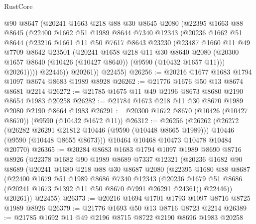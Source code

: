 \begin{lexlean}{RustCore}
\begin{coremodule}
        @90
        @8647
        (@20241
          @1663
          @218
          @88
          @30
          @8645
          @2080
          (@22395
            @1663
            @88
            @8645
            (@22400
              @1662
              @51
              @1989
              @8644
              @7340
              @12343
              (@20236
                @1662
                @51
                @8644
                (@23216
                  @1661
                  @11
                  @50
                  @7617
                  @8643
                  @23230
                  (@23487
                    @1660
                    @11
                    @49
                    @7709
                    @8642
                    @23501
                    (@20241
                      @1658
                      @218
                      @11
                      @30
                      @8640
                      @2080
                      (@20300 @1657 @8640 (@10426 (@10427 @8640)) (@9590 (@10432 @1657 @11)))
                      @20261))))
              @22446))
          @20261))
      @22455)
@26256 := @20216 @1677 @1683 @1794 @1097 @8674 @8683 @1989 @8928
@26262 := @21776 @1676 @50 @13 @8674 @8681 @2214
@26272 := @21785 @1675 @11 @49 @2196 @8673 @8680 @2190 @8654 @1983 @20258
@26282 := @21784 @1673 @218 @11 @30 @8670 @1989 @2080 @2190 @8664 @1983
@26291 := @20300 @1672 @8670 (@10426 (@10427 @8670)) (@9590 (@10432 @1672 @11))
@26312 := @26256
    (@26262
      (@26272
        (@26282 @26291 @21812 @10446 (@9590 (@10448 @8665 @1989)))
        @10446
        (@9590 (@10448 @8655 @8673)))
      @10464
      @10468
      @10473
      @10478
      @10484
      @20770)
@26365 := @20284
    @8683
    @1683
    @1794
    @1097
    @1989
    @8690
    @8716
    @8926
    (@22378
      @1682
      @90
      @1989
      @8689
      @7337
      @12321
      (@20236
        @1682
        @90
        @8689
        (@20241
          @1680
          @218
          @88
          @30
          @8687
          @2080
          (@22395
            @1680
            @88
            @8687
            (@22400
              @1679
              @51
              @1989
              @8686
              @7340
              @12343
              (@20236 @1679 @51 @8686 (@20241 @1673 @1392 @11 @50 @8670 @7991 @26291 @24361))
              @22446))
          @20261))
      @22455)
@26373 := @20216 @1694 @1701 @1793 @1097 @8716 @8725 @1989 @8926
@26379 := @21776 @1693 @50 @13 @8716 @8723 @2214
@26389 := @21785 @1692 @11 @49 @2196 @8715 @8722 @2190 @8696 @1983 @20258

\end{coremodule}
\end{lexlean}
